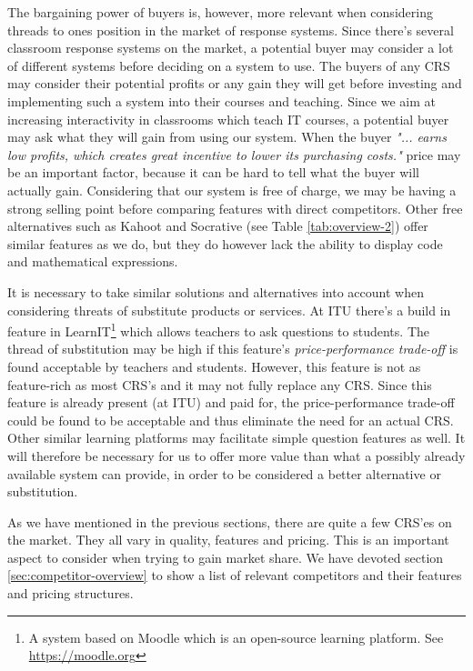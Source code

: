 The bargaining power of buyers is, however, more relevant when considering threads to ones position in the market of response systems. Since there's several classroom response systems on the market, a potential buyer may consider a lot of different systems before deciding on a system to use. The buyers of any CRS may consider their potential profits or any gain they will get before investing and implementing such a system into their courses and teaching. Since we aim at increasing interactivity in classrooms which teach IT courses, a potential buyer may ask what they will gain from using our system. When the buyer \emph{"... earns low profits, which creates great incentive to lower its purchasing costs."} \cite[p.~141]{porter1979competitive} price may be an important factor, because it can be hard to tell what the buyer will actually gain. Considering that our system is free of charge, we may be having a strong selling point before comparing features with direct competitors. Other free alternatives such as Kahoot and Socrative (see Table \ref{tab:overview-2}) offer similar features as we do, but they do however lack the ability to display code and mathematical expressions.


It is necessary to take similar solutions and alternatives into account when considering threats of substitute products or services. At ITU there's a build in feature in LearnIT\footnote{A system based on Moodle which is an open-source learning platform. See \url{https://moodle.org}} which allows teachers to ask questions to students. The thread of substitution may be high if this feature's \emph{price-performance trade-off} is found acceptable by teachers and students. However, this feature is not as feature-rich as most CRS's and it may not fully replace any CRS. Since this feature is already present (at ITU) and paid for, the price-performance trade-off could be found to be acceptable and thus eliminate the need for an actual CRS. Other similar learning platforms may facilitate simple question features as well. It will therefore be necessary for us to offer more value than what a possibly already available system can provide, in order to be considered a better alternative or substitution. 


As we have mentioned in the previous sections, there are quite a few CRS'es on the market. They all vary in quality, features and pricing. This is an important aspect to consider when trying to gain market share. We have devoted section \ref{sec:competitor-overview} to show a list of relevant competitors and their features and pricing structures.








